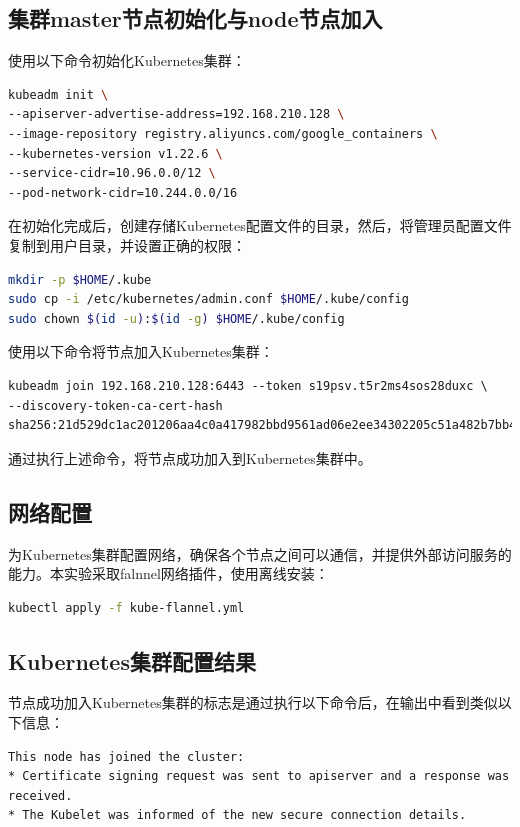 \subsection{集群master节点初始化与node节点加入}
使用以下命令初始化Kubernetes集群：
\begin{lstlisting}[language=bash]
kubeadm init \
--apiserver-advertise-address=192.168.210.128 \
--image-repository registry.aliyuncs.com/google_containers \
--kubernetes-version v1.22.6 \
--service-cidr=10.96.0.0/12 \
--pod-network-cidr=10.244.0.0/16
\end{lstlisting}

在初始化完成后，创建存储Kubernetes配置文件的目录，然后，将管理员配置文件复制到用户目录，并设置正确的权限：
\begin{lstlisting}[language=bash]
mkdir -p $HOME/.kube
sudo cp -i /etc/kubernetes/admin.conf $HOME/.kube/config
sudo chown $(id -u):$(id -g) $HOME/.kube/config
\end{lstlisting}

使用以下命令将节点加入Kubernetes集群：
\begin{verbatim}
kubeadm join 192.168.210.128:6443 --token s19psv.t5r2ms4sos28duxc \
--discovery-token-ca-cert-hash sha256:21d529dc1ac201206aa4c0a417982bbd9561ad06e2ee34302205c51a482b7bb4
\end{verbatim}
通过执行上述命令，将节点成功加入到Kubernetes集群中。

\subsection{网络配置}
为Kubernetes集群配置网络，确保各个节点之间可以通信，并提供外部访问服务的能力。本实验采取falnnel网络插件，使用离线安装：
\begin{lstlisting}[language=bash]
kubectl apply -f kube-flannel.yml
\end{lstlisting}

\subsection{Kubernetes集群配置结果}
节点成功加入Kubernetes集群的标志是通过执行以下命令后，在输出中看到类似以下信息：
\begin{verbatim}
This node has joined the cluster:
* Certificate signing request was sent to apiserver and a response was received.
* The Kubelet was informed of the new secure connection details.
\end{verbatim}

